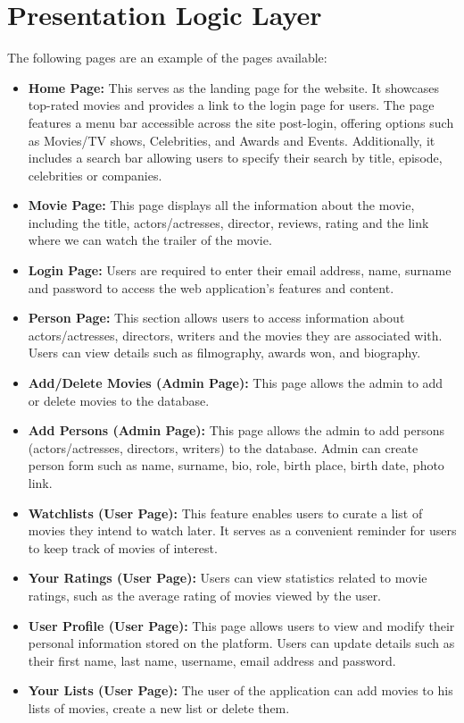 \section{Presentation Logic Layer}


The following pages are an example of the pages available:

\begin{itemize}

\item \textbf {Home Page:} This serves as the landing page for the website. It showcases top-rated movies and provides a link to the login page for users. The page features a menu bar accessible across the site post-login, offering options such as Movies/TV shows, Celebrities, and Awards and Events. Additionally, it includes a search bar allowing users to specify their search by title, episode, celebrities or companies.
\item \textbf {Movie Page:} This page displays all the information about the movie, including the title, actors/actresses, director, reviews, rating and the link where we can watch the trailer of the movie.
\item \textbf {Login Page:} Users are required to enter their email address, name, surname and password to access the web application's features and content.
\item \textbf {Person Page:} This section allows users to access information about actors/actresses, directors, writers and the movies they are associated with. Users can view details such as filmography, awards won, and biography.
\item \textbf {Add/Delete Movies (Admin Page):} This page allows the admin to add or delete movies to the database.
\item \textbf {Add Persons (Admin Page):} This page allows the admin to add persons (actors/actresses, directors, writers) to the database. Admin can create person form such as name, surname, bio, role, birth place, birth date, photo link.
\item \textbf {Watchlists (User Page):} This feature enables users to curate a list of movies they intend to watch later. It serves as a convenient reminder for users to keep track of movies of interest.
\item \textbf {Your Ratings (User Page):} Users can view statistics related to movie ratings, such as the average rating of movies viewed by the user. 
 \item \textbf {User Profile (User Page):} This page allows users to view and modify their personal information stored on the platform. Users can update details such as their first name, last name, username, email address and password.
  \item \textbf {Your Lists (User Page):} The user of the application can add movies to his lists of movies, create a new list or delete them.
 
\end{itemize}

